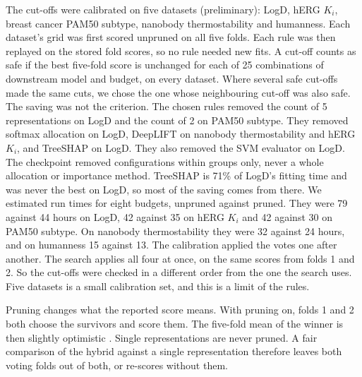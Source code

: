 The cut-offs were calibrated on five datasets (preliminary): LogD, hERG $K_i$, breast cancer PAM50 subtype, nanobody thermostability and humanness. Each dataset's grid was first scored unpruned on all five folds. Each rule was then replayed on the stored fold scores, so no rule needed new fits. A cut-off counts as safe if the best five-fold score is unchanged for each of 25 combinations of downstream model and budget, on every dataset. Where several safe cut-offs made the same cuts, we chose the one whose neighbouring cut-off was also safe. The saving was not the criterion. The chosen rules removed the count of 5 representations on LogD and the count of 2 on PAM50 subtype. They removed softmax allocation on LogD, DeepLIFT on nanobody thermostability and hERG $K_i$, and TreeSHAP on LogD. They also removed the SVM evaluator on LogD. The checkpoint removed configurations within groups only, never a whole allocation or importance method. TreeSHAP is 71\% of LogD's fitting time and was never the best on LogD, so most of the saving comes from there. We estimated run times for eight budgets, unpruned against pruned. They were 79 against 44 hours on LogD, 42 against 35 on hERG $K_i$ and 42 against 30 on PAM50 subtype. On nanobody thermostability they were 32 against 24 hours, and on humanness 15 against 13. The calibration applied the votes one after another. The search applies all four at once, on the same scores from folds 1 and 2. So the cut-offs were checked in a different order from the one the search uses. Five datasets is a small calibration set, and this is a limit of the rules.

Pruning changes what the reported score means. With pruning on, folds 1 and 2 both choose the survivors and score them. The five-fold mean of the winner is then slightly optimistic \citep{Cawley2010}. Single representations are never pruned. A fair comparison of the hybrid against a single representation therefore leaves both voting folds out of both, or re-scores without them.

